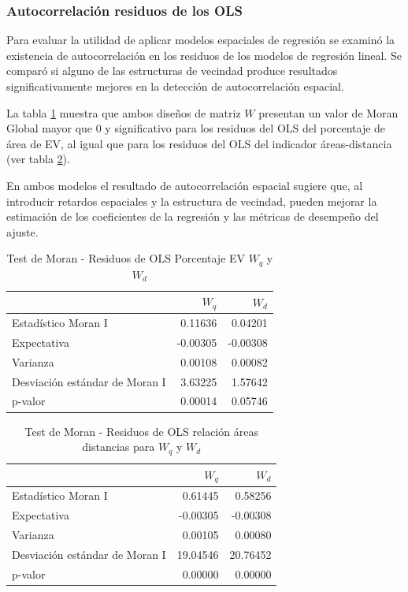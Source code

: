 \documentclass[12pt,a4paper,oneside, openany]{book}
\theoremstyle{definition}
\theoremstyle{definition}
\theoremstyle{definition}
\theoremstyle{remark}
\begin{document}
\subsubsection{Autocorrelación residuos de los
OLS}\label{autocorrelaciuxf3n-residuos-de-los-ols-1}

Para evaluar la utilidad de aplicar modelos espaciales de regresión se
examinó la existencia de autocorrelación en los residuos de los modelos
de regresión lineal. Se comparó si alguno de las estructuras de vecindad
produce resultados significativamente mejores en la detección de
autocorrelación espacial.

La tabla \ref{tab:moran-resareaep-w} muestra que ambos diseños de matriz
\(W\) presentan un valor de Moran Global mayor que 0 y significativo
para los residuos del OLS del porcentaje de área de EV, al igual que
para los residuos del OLS del indicador áreas-distancia (ver tabla
\ref{tab:moran-resareadist-w}).

En ambos modelos el resultado de autocorrelación espacial sugiere que,
al introducir retardos espaciales y la estructura de vecindad, pueden
mejorar la estimación de los coeficientes de la regresión y las métricas
de desempeño del ajuste.

\begin{table}[H]

\caption{\label{tab:moran-resareaep-w}Test de Moran - Residuos de OLS Porcentaje EV $W_q$ y $W_d$}
\centering
\begin{tabular}{lrr}
\toprule
  & $W_q$ & $W_d$\\
\midrule
Estadístico Moran I & 0.11636 & 0.04201\\
Expectativa & -0.00305 & -0.00308\\
Varianza & 0.00108 & 0.00082\\
Desviación estándar de Moran I & 3.63225 & 1.57642\\
p-valor & 0.00014 & 0.05746\\
\bottomrule
\end{tabular}
\end{table}

\begin{table}[H]

\caption{\label{tab:moran-resareadist-w}Test de Moran - Residuos de OLS relación áreas distancias para $W_q$ y $W_d$}
\centering
\begin{tabular}{lrr}
\toprule
  & $W_q$ & $W_d$\\
\midrule
Estadístico Moran I & 0.61445 & 0.58256\\
Expectativa & -0.00305 & -0.00308\\
Varianza & 0.00105 & 0.00080\\
Desviación estándar de Moran I & 19.04546 & 20.76452\\
p-valor & 0.00000 & 0.00000\\
\bottomrule
\end{tabular}
\end{table}
\end{document}

